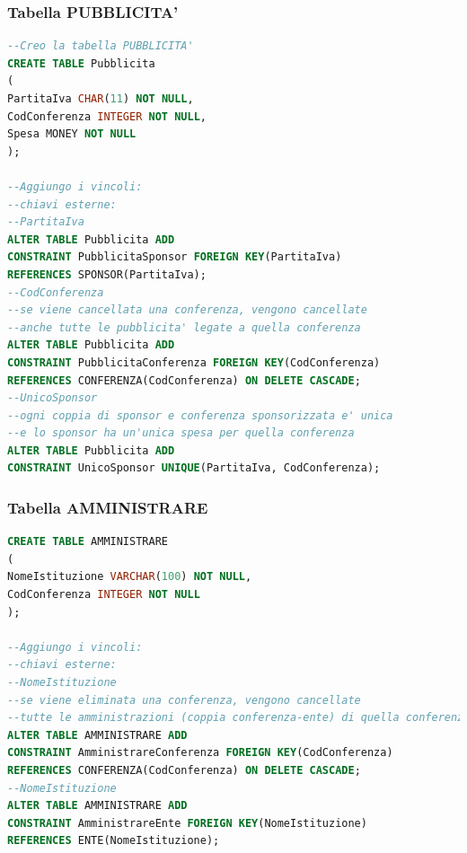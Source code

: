 \documentclass[a4page]{article}
\begin{document}
\subsubsection{Tabella PUBBLICITA'}
\begin{lstlisting}[language=SQL,
        deletekeywords={IDENTITY,INT},
        morekeywords={clustered},    
        framesep=10pt,
        framextopmargin=10pt]
--Creo la tabella PUBBLICITA'
CREATE TABLE Pubblicita
(
PartitaIva CHAR(11) NOT NULL,
CodConferenza INTEGER NOT NULL,
Spesa MONEY NOT NULL
);

--Aggiungo i vincoli:
--chiavi esterne:
--PartitaIva
ALTER TABLE Pubblicita ADD
CONSTRAINT PubblicitaSponsor FOREIGN KEY(PartitaIva)
REFERENCES SPONSOR(PartitaIva);
--CodConferenza
--se viene cancellata una conferenza, vengono cancellate
--anche tutte le pubblicita' legate a quella conferenza
ALTER TABLE Pubblicita ADD
CONSTRAINT PubblicitaConferenza FOREIGN KEY(CodConferenza)
REFERENCES CONFERENZA(CodConferenza) ON DELETE CASCADE;
--UnicoSponsor
--ogni coppia di sponsor e conferenza sponsorizzata e' unica
--e lo sponsor ha un'unica spesa per quella conferenza
ALTER TABLE Pubblicita ADD
CONSTRAINT UnicoSponsor UNIQUE(PartitaIva, CodConferenza);        

\end{lstlisting}
\subsubsection{Tabella AMMINISTRARE}
\begin{lstlisting}[language=SQL,
        deletekeywords={IDENTITY,INT},
        morekeywords={clustered},    
        framesep=10pt,
        framextopmargin=10pt]
CREATE TABLE AMMINISTRARE
(
NomeIstituzione VARCHAR(100) NOT NULL,
CodConferenza INTEGER NOT NULL
);

--Aggiungo i vincoli:
--chiavi esterne:
--NomeIstituzione
--se viene eliminata una conferenza, vengono cancellate
--tutte le amministrazioni (coppia conferenza-ente) di quella conferenza
ALTER TABLE AMMINISTRARE ADD
CONSTRAINT AmministrareConferenza FOREIGN KEY(CodConferenza)
REFERENCES CONFERENZA(CodConferenza) ON DELETE CASCADE;
--NomeIstituzione
ALTER TABLE AMMINISTRARE ADD
CONSTRAINT AmministrareEnte FOREIGN KEY(NomeIstituzione)
REFERENCES ENTE(NomeIstituzione);        

\end{lstlisting}
\end{document}
